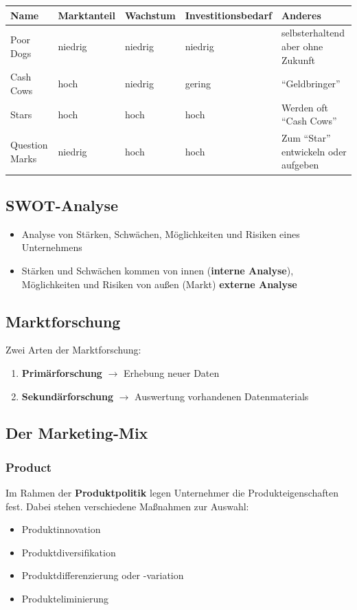 \documentclass[titlepage,parskip=half]{scrartcl}
\begin{document}
\begin{tabularx}{\textwidth}{|l|l|l|l|X|} \hline
    Name & Marktanteil & Wachstum & Investitionsbedarf & Anderes \\ \hline
    Poor Dogs & niedrig & niedrig & niedrig & selbsterhaltend aber ohne Zukunft \\ \hline
    Cash Cows & hoch & niedrig & gering & \enquote{Geldbringer} \\ \hline
    Stars & hoch & hoch & hoch & Werden oft \enquote{Cash Cows} \\ \hline
    Question Marks & niedrig & hoch & hoch & Zum \enquote{Star} entwickeln oder aufgeben \\ \hline
\end{tabularx}



\subsection{SWOT-Analyse}
\begin{itemize}
    \item Analyse von Stärken, Schwächen, Möglichkeiten und Risiken eines Unternehmens
    \item Stärken und Schwächen kommen von innen (\textbf{interne Analyse}), Möglichkeiten und Risiken von außen (Markt) \textbf{externe Analyse}
\end{itemize}

\subsection{Marktforschung}
Zwei Arten der Marktforschung:
\begin{enumerate}
    \item \textbf{Primärforschung} $\rightarrow$ Erhebung neuer Daten
    \item \textbf{Sekundärforschung} $\rightarrow$ Auswertung vorhandenen Datenmaterials
\end{enumerate}

\subsection{Der Marketing-Mix}
\subsubsection{Product}
Im Rahmen der \textbf{Produktpolitik} legen Unternehmer die Produkteigenschaften fest. Dabei stehen verschiedene Maßnahmen zur Auswahl:
\begin{itemize}
    \item Produktinnovation
    \item Produktdiversifikation
    \item Produktdifferenzierung oder -variation
    \item Produkteliminierung
\end{itemize}
\end{document}
